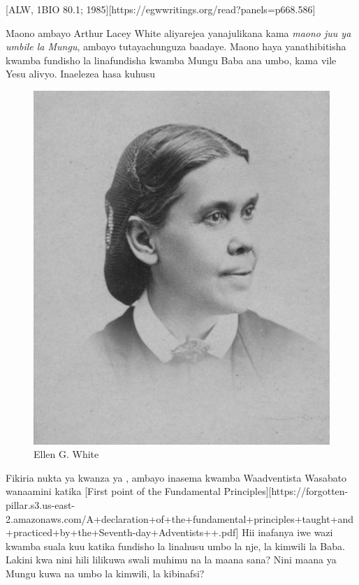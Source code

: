 [ALW, 1BIO 80.1; 1985][https://egwwritings.org/read?panels=p668.586]

Maono ambayo Arthur Lacey White aliyarejea yanajulikana kama \textit{maono juu ya umbile la Mungu}, ambayo tutayachunguza baadaye. Maono haya yanathibitisha kwamba fundisho la  linafundisha kwamba Mungu Baba ana umbo, kama vile Yesu alivyo. Inaelezea hasa kuhusu 

\begin{figure}[t]
    \centering
    \includegraphics[width=0.65\linewidth]{images/ellen-white.jpg}
    \caption*{Ellen G. White}
    \label{fig:ellen-g-white}
\end{figure}

Fikiria nukta ya kwanza ya , ambayo inasema kwamba Waadventista Wasabato wanaamini katika [First point of the Fundamental Principles][https://forgotten-pillar.s3.us-east-2.amazonaws.com/A+declaration+of+the+fundamental+principles+taught+and+practiced+by+the+Seventh-day+Adventists++.pdf] Hii inafanya iwe wazi kwamba suala kuu katika fundisho la  linahusu umbo la nje, la kimwili la Baba. Lakini kwa nini hili lilikuwa swali muhimu na la maana sana? Nini maana ya Mungu kuwa na umbo la kimwili, la kibinafsi?

